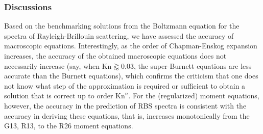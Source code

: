 \subsubsection{Discussions}\label{Conclusions}


Based on the benchmarking solutions from the Boltzmann equation for the spectra of Rayleigh-Brillouin scattering, we have assessed the accuracy of macroscopic equations. Interestingly, as the order of Chapman-Enskog expansion increases, the accuracy of the obtained macroscopic equations does not necessarily increase (say, when $\text{Kn}\gtrapprox0.03$, the super-Burnett equations are less accurate than the Burnett equations), which confirms the criticism that one does not know what step of the approximation is required or sufficient to obtain a solution that is correct up to order $\text{Kn}^n$. For the (regularized) moment equations, however, the accuracy in the prediction of RBS spectra is consistent with the accuracy in deriving these equations, that is, increases monotonically from the G13, R13, to the R26 moment equations. 

%



